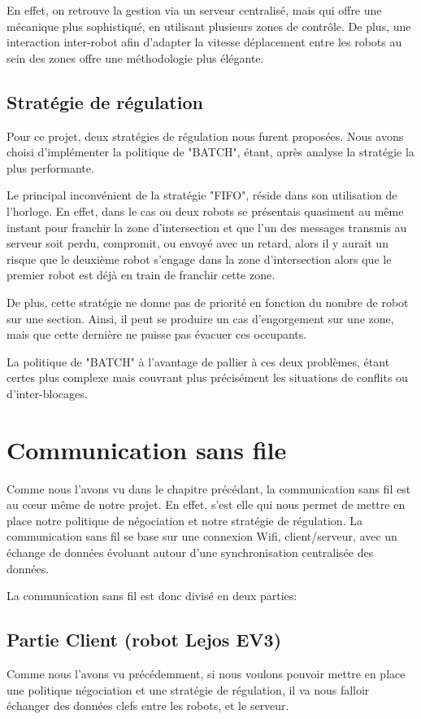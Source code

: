 \documentclass[french,a4paper,12pt]{report}
\begin{document}
En effet, on retrouve la gestion via un serveur centralisé, mais qui offre une mécanique plus sophistiqué, en utilisant plusieurs zones de contrôle. De plus, une interaction inter-robot afin d'adapter la vitesse déplacement entre les robots au sein des zones offre une méthodologie plus élégante. 

\section{Stratégie de régulation}
Pour ce projet, deux stratégies de régulation nous furent proposées.
Nous avons choisi d'implémenter la politique de "BATCH", étant, après analyse la stratégie la plus performante.

Le principal inconvénient de la stratégie "FIFO", réside dans son utilisation de l'horloge.
En effet, dans le cas ou deux robots se présentais quasiment au même instant pour franchir la zone d'intersection et que l'un des messages transmis au serveur soit perdu, compromit, ou envoyé avec un retard, alors il y aurait un risque que le deuxième robot s'engage dans la zone d'intersection alors que le premier robot est déjà en train de franchir cette zone.

De plus, cette stratégie ne donne pas de priorité en fonction du nombre de robot sur une section. Ainsi, il peut se produire un cas d'engorgement sur une zone, mais que cette dernière ne puisse pas évacuer ces occupants.

La politique de "BATCH" à l'avantage de pallier à ces deux problèmes, étant certes plus complexe mais couvrant plus précisément les situations de conflits ou d'inter-blocages.

\chapter{Communication sans file}
Comme nous l'avons vu dans le chapitre précédant, la communication sans fil est au cœur même de notre projet. En effet, s'est elle qui nous permet de mettre en place notre politique de négociation et notre stratégie de régulation.
La communication sans fil se base sur une connexion Wifi, client/serveur, avec un échange de données évoluant autour d'une synchronisation centralisée des données.

La communication sans fil est donc divisé en deux parties:

\section{Partie Client (robot Lejos EV3)}%
Comme nous l'avons vu précédemment, si nous voulons pouvoir mettre en place une politique négociation et une stratégie de régulation, il va nous falloir échanger des données clefs entre les robots, et le serveur.
\end{document}
